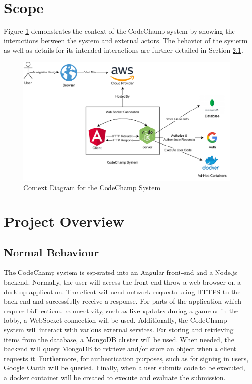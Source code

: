 \documentclass[12pt, titlepage]{article}
\begin{document}
\section{Scope}
Figure \ref{fig:context} demonstrates the context of the CodeChamp system by showing the interactions between the system and external actors. The behavior of the systerm as well as details for its intended interactions are further detailed in Section \ref{sec:nb}.

\begin{figure}[H]
\centering
\includegraphics[scale=1.0]{Design/SystDesign/SystemBoundary.pdf}
\caption{Context Diagram for the CodeChamp System}\label{fig:context}
\end{figure}

\section{Project Overview}

\subsection{Normal Behaviour}\label{sec:nb}
The CodeChamp system is seperated into an Angular front-end and a Node.js backend. Normally, the user will access the front-end throw a web browser on a desktop application. The client will send network requests using HTTPS to the back-end and successfully receive a response. For parts of the application which require bidirectional connectivity, such as live updates during a game or in the lobby, a WebSocket connection will be used. Additionally, the CodeChamp system will interact with various external services. For storing and retrieving items from the database, a MongoDB cluster will be used. When needed, the backend will query MongoDB to retrieve and/or store an object when a client requests it. Furthermore, for authentication purposes, such as for signing in users, Google Oauth will be queried. Finally, when a user submits code to be executed, a docker container will be created to execute and evaluate the submission.
\end{document}
